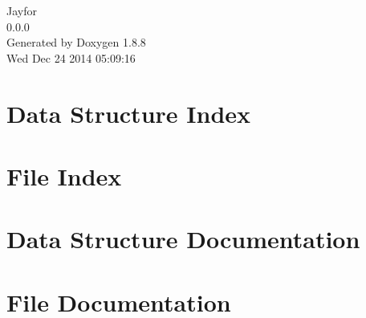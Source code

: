 \documentclass[twoside]{book}
\newcommand{\+}{\discretionary{\mbox{\scriptsize$\hookleftarrow$}}{}{}}
\newcommand{\clearemptydoublepage}{%
  \newpage{\pagestyle{empty}\cleardoublepage}%
}
\begin{document}
\hypersetup{pageanchor=false,
             bookmarks=true,
             bookmarksnumbered=true,
             pdfencoding=unicode
            }
\begin{titlepage}
\vspace*{7cm}
\begin{center}%
{\Large Jayfor \\[1ex]\large 0.\+0.\+0 }\\
\vspace*{1cm}
{\large Generated by Doxygen 1.8.8}\\
\vspace*{0.5cm}
{\small Wed Dec 24 2014 05:09:16}\\
\end{center}
\end{titlepage}
\clearemptydoublepage
\tableofcontents
\clearemptydoublepage
{}
\hypersetup{pageanchor=true}

\chapter{Data Structure Index}

\chapter{File Index}

\chapter{Data Structure Documentation}




























\chapter{File Documentation}






















\newpage
{}
{}
\printindex
\end{document}
